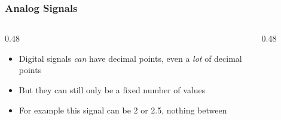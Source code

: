 \begin{frame}
    \frametitle{Analog Signals}

    \begin{columns}
        \begin{column}{0.48\linewidth}
            \begin{itemize}
                \item Digital signals \emph{can} have decimal points, even a \emph{lot} of decimal points
                \item But they can still only be a fixed number of values
                \item For example this signal can be 2 or 2.5, nothing between
            \end{itemize}
        \end{column}
        \begin{column}{0.48\linewidth}
            \begin{figure}
                \centering
                \resizebox{\linewidth}{!}{
                    
                }
            \end{figure}
        \end{column}        
    \end{columns}
\end{frame}

